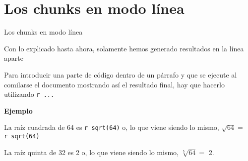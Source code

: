 \documentclass[ignorenonframetext,]{beamer}
\begin{document}
\hypertarget{los-chunks-en-modo-linea}{%
\section{Los chunks en modo línea}\label{los-chunks-en-modo-linea}}

\begin{frame}[fragile]{Los chunks en modo línea}
\protect\hypertarget{los-chunks-en-modo-linea-1}{}

Con lo explicado hasta ahora, solamente hemos generado resultados en la
línea aparte

Para introducir una parte de código dentro de un párrafo y que se
ejecute al comilarse el documento mostrando así el resultado final, hay
que hacerlo utilizando \texttt{\textasciigrave{}r\ ...\textasciigrave{}}

\textbf{Ejemplo}

La raíz cuadrada de 64 es
\texttt{\textasciigrave{}r\ sqrt(64)\textasciigrave{}} o, lo que viene
siendo lo mismo,
\(\sqrt{64}=\)\texttt{\textasciigrave{}r\ sqrt(64)\textasciigrave{}}

La raíz quinta de 32 es 2 o, lo que viene siendo lo mismo,
\(\sqrt[5]{64}=\) 2.

\end{frame}
\end{document}
